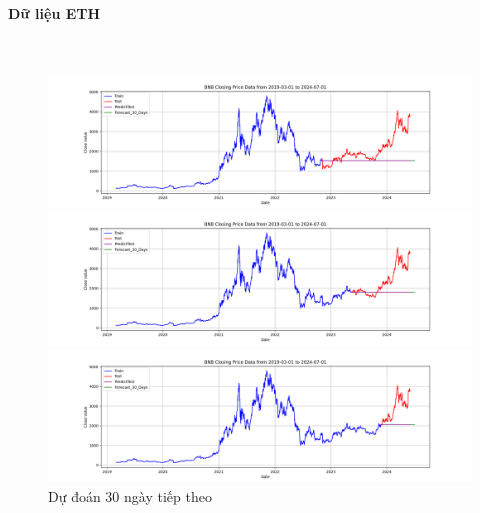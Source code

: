 \documentclass[conference]{IEEEtran}
\begin{document}
\paragraph{\textbf{Dữ liệu ETH}} \mbox{} \\
\begin{figure}[H]
    \centering
    \begin{minipage}{0.15\textwidth}
    \centering
    \includegraphics[width=1\textwidth]{Figure/ARIMA_ETH_30days_73.png}
    \end{minipage}
    \hfill
    \begin{minipage}{0.15\textwidth}
    \centering
    \includegraphics[width=1\textwidth]{Figure/ARIMA_ETH_30days_82.png}
    \end{minipage}
    \hfill
    \begin{minipage}{0.15\textwidth}
    \centering
    \includegraphics[width=1\textwidth]{Figure/ARIMA_ETH_30days_91.png}
    \end{minipage}
    \caption{Dự đoán 30 ngày tiếp theo}
    \label{fig:1}
\end{figure}
\end{document}
